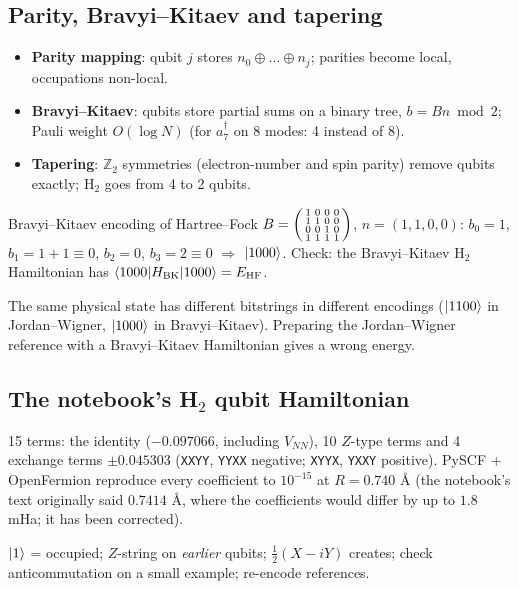 \documentclass[11pt,a4paper,openany]{book}
\newcounter{wex}[chapter]
\begin{document}
\subsection{Parity, Bravyi--Kitaev and tapering}
\begin{itemize}
\item \textbf{Parity mapping}: qubit $j$ stores $n_0 \oplus\dots\oplus n_j$; parities become local, occupations non-local.
\item \textbf{Bravyi--Kitaev}: qubits store partial sums on a binary tree, $b = Bn \bmod 2$; Pauli weight $O(\log N)$ (for $a_7^\dagger$ on 8 modes: 4 instead of 8).
\item \textbf{Tapering}: $\mathbb Z_2$ symmetries (electron-number and spin parity) remove qubits exactly; H$_2$ goes from 4 to 2 qubits.
\end{itemize}
\begin{wexample}{Bravyi--Kitaev encoding of Hartree--Fock}
$B = \begin{psmallmatrix}1&0&0&0\\1&1&0&0\\0&0&1&0\\1&1&1&1\end{psmallmatrix}$, $n = (1, 1, 0, 0)$: $b_0 = 1$, $b_1 = 1 + 1 \equiv 0$, $b_2 = 0$, $b_3 = 2 \equiv 0$ $\Rightarrow$ $\ket{1000}$. Check: the
Bravyi--Kitaev H$_2$ Hamiltonian has $\braket{1000|H_{\mathrm{BK}}|1000} = E_{\mathrm{HF}}$.
\end{wexample}
\begin{trap}
The same physical state has different bitstrings in different encodings ($\ket{1100}$ in Jordan--Wigner, $\ket{1000}$ in Bravyi--Kitaev). Preparing the
Jordan--Wigner reference with a Bravyi--Kitaev Hamiltonian gives a wrong energy.
\end{trap}

\subsection{The notebook's H$_2$ qubit Hamiltonian}
15 terms: the identity ($-0.097066$, including $V_{NN}$), 10 $Z$-type terms and 4 exchange terms $\pm0.045303$ (\texttt{XXYY}, \texttt{YYXX} negative;
\texttt{XYYX}, \texttt{YXXY} positive). PySCF + OpenFermion reproduce every coefficient to $10^{-15}$ at $R = 0.740$ \AA{} (the notebook's text
originally said $0.7414$ \AA, where the coefficients would differ by up to $1.8$ mHa; it has been corrected).
\begin{checklist}
$\ket1$ = occupied; $Z$-string on \emph{earlier} qubits; $\tfrac12(X - iY)$ creates; check anticommutation on a small example; re-encode references.
\end{checklist}
\end{document}

